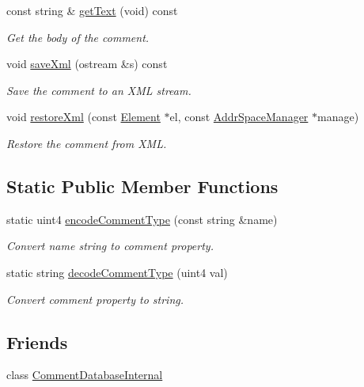 \begin{DoxyCompactItemize}
const string \& \mbox{\hyperlink{class_comment_ad35a8f8b4ed02aaec090e6d912ffc47d}{get\+Text}} (void) const
\begin{DoxyCompactList}\small\item\em Get the body of the comment. \end{DoxyCompactList}\item 
void \mbox{\hyperlink{class_comment_af5f3045a6d056b6c00af6fc35c741b0a}{save\+Xml}} (ostream \&s) const
\begin{DoxyCompactList}\small\item\em Save the comment to an X\+ML stream. \end{DoxyCompactList}\item 
void \mbox{\hyperlink{class_comment_a191cf541d9b91d88fba9c54c14f5c73d}{restore\+Xml}} (const \mbox{\hyperlink{class_element}{Element}} $\ast$el, const \mbox{\hyperlink{class_addr_space_manager}{Addr\+Space\+Manager}} $\ast$manage)
\begin{DoxyCompactList}\small\item\em Restore the comment from X\+ML. \end{DoxyCompactList}\end{DoxyCompactItemize}
\subsection*{Static Public Member Functions}
\begin{DoxyCompactItemize}
\item 
static uint4 \mbox{\hyperlink{class_comment_acc7b6ccc5f0d5645e1304952f3d08292}{encode\+Comment\+Type}} (const string \&name)
\begin{DoxyCompactList}\small\item\em Convert name string to comment property. \end{DoxyCompactList}\item 
static string \mbox{\hyperlink{class_comment_af30bb24a512fb5f9ed352be71a26ff2d}{decode\+Comment\+Type}} (uint4 val)
\begin{DoxyCompactList}\small\item\em Convert comment property to string. \end{DoxyCompactList}\end{DoxyCompactItemize}
\subsection*{Friends}
\begin{DoxyCompactItemize}
\item 
class \mbox{\hyperlink{class_comment_a075d4f05616865ad828b69262fceb48a}{Comment\+Database\+Internal}}
\end{DoxyCompactItemize}



